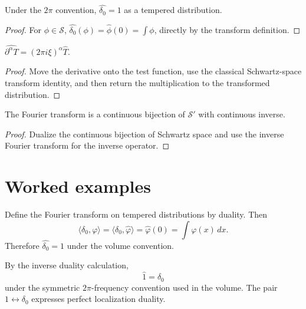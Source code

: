 \begin{theorem}\label{thm:iii19-01}
Under the $2\pi$ convention, $\widehat{\delta_0}=1$ as a tempered distribution.
\begin{proof}
For $\phi\in\mathcal S$, $\widehat{\delta_0}(\phi)=\widehat\phi(0)=\int\phi$, directly by the transform definition.
\end{proof}
\end{theorem}

\begin{theorem}\label{thm:iii19-02}
$\widehat{\partial^\alpha T}=(2\pi i\xi)^\alpha\widehat T$.
\begin{proof}
Move the derivative onto the test function, use the classical Schwartz-space transform identity, and then return the multiplication to the transformed distribution.
\end{proof}
\end{theorem}

\begin{theorem}\label{thm:iii19-03}
The Fourier transform is a continuous bijection of $\mathcal S'$ with continuous inverse.
\begin{proof}
Dualize the continuous bijection of Schwartz space and use the inverse Fourier transform for the inverse operator.
\end{proof}
\end{theorem}

\section{Worked examples}

\begin{example}\label{ex:iii19-worked-01}
Define the Fourier transform on tempered distributions by duality. Then
\[
\langle\widehat{\delta_0},\varphi\rangle
=\langle\delta_0,\widehat\varphi\rangle
=\widehat\varphi(0)
=\int\varphi(x)\,dx.
\]
Therefore \(\widehat{\delta_0}=1\) under the volume convention.
\end{example}

\begin{example}\label{ex:iii19-worked-02}
By the inverse duality calculation,
\[
\widehat{1}=\delta_0
\]
under the symmetric \(2\pi\)-frequency convention used in the volume. The pair
\(1\leftrightarrow\delta_0\) expresses perfect localization duality.
\end{example}

